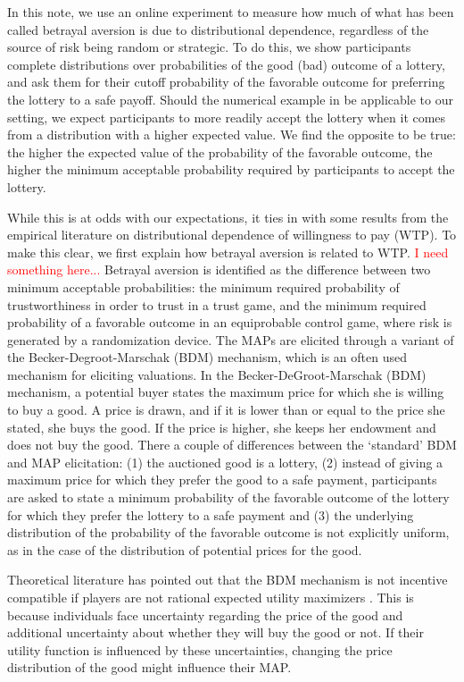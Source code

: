 In this note, we use an online experiment to measure how much of what has been called betrayal aversion is due to distributional dependence, regardless of the source of risk being random or strategic.
To do this, we show participants complete distributions over probabilities of the good (bad) outcome of a lottery, and ask them for their cutoff probability of the favorable outcome for preferring the lottery to a safe payoff.
Should the numerical example in \cite[Appendix A][]{Li2020a} be applicable to our setting, we expect participants to more readily accept the lottery when it comes from a distribution with a higher expected value.
We find the opposite to be true: the higher the expected value of the probability of the favorable outcome, the higher the minimum acceptable probability required by participants to accept the lottery.

While this is at odds with our expectations, it ties in with some results from the empirical literature on distributional dependence of willingness to pay (WTP).
To make this clear, we first explain how betrayal aversion is related to WTP.
\textcolor{red}{I need something here...}
Betrayal aversion is identified as the difference between two minimum acceptable probabilities: the minimum required probability of trustworthiness in order to trust in a trust game, and the minimum required probability of a favorable outcome in an equiprobable control game, where risk is generated by a randomization device.
The MAPs are elicited through a variant of the Becker-Degroot-Marschak (BDM) \citep{Becker1964} mechanism, which is an often used mechanism for eliciting valuations.
In the Becker-DeGroot-Marschak (BDM) mechanism, a potential buyer states the maximum price for which she is willing to buy a good.
A price is drawn, and if it is lower than or equal to the price she stated, she buys the good.
If the price is higher, she keeps her endowment and does not buy the good.
There a couple of differences between the `standard' BDM and MAP elicitation: (1) the auctioned good is a lottery, (2) instead of giving a maximum price for which they prefer the good to a safe payment, participants are asked to state a minimum probability of the favorable outcome of the lottery for which they prefer the lottery to a safe payment and (3) the underlying distribution of the probability of the favorable outcome is not explicitly uniform, as in the case of the distribution of potential prices for the good.

Theoretical literature has pointed out that the BDM mechanism is not incentive compatible if players are not rational expected utility maximizers \citep{Karni1987,Horowitz2006}.
This is because individuals face uncertainty regarding the price of the good and additional uncertainty about whether they will buy the good or not.
If their utility function is influenced by these uncertainties, changing the price distribution of the good might influence their MAP.

